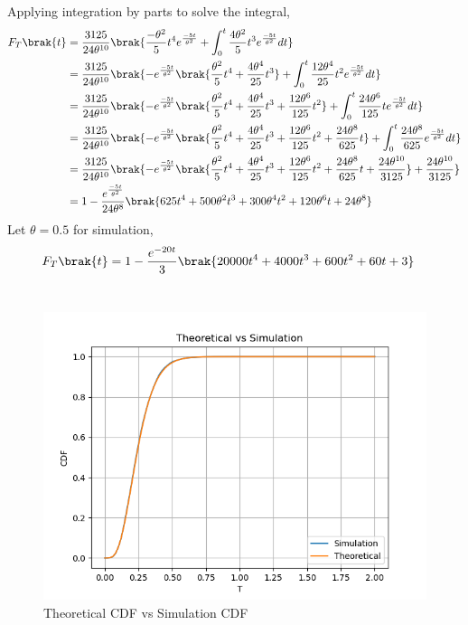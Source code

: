 \documentclass[journal,12pt,onecolumn]{IEEEtran}
\theoremstyle{remark}
\begin{document}
Applying integration by parts to solve the integral,
\begin{align}
	F_T\brak{t} &= \frac{3125}{24\theta^{10}}\brak{\frac{-\theta^2}{5}t^4e^{\frac{-5t}{\theta^2}} + \int^t_0{\frac{4\theta^2}{5}t^3e^{\frac{-5t}{\theta^2}}dt}}\\
	&= \frac{3125}{24\theta^{10}}\brak{-e^{\frac{-5t}{\theta^2}}\brak{\frac{\theta^2}{5}t^4 + \frac{4\theta^4}{25}t^3} + \int^t_0{\frac{12\theta^4}{25}t^2e^{\frac{-5t}{\theta^2}}dt}}\\
	&= \frac{3125}{24\theta^{10}}\brak{-e^{\frac{-5t}{\theta^2}}\brak{\frac{\theta^2}{5}t^4 + \frac{4\theta^4}{25}t^3 + \frac{12\theta^6}{125}t^2}+\int^t_0{\frac{24\theta^6}{125}te^{\frac{-5t}{\theta^2}}dt}}\\
	&= \frac{3125}{24\theta^{10}}\brak{-e^{\frac{-5t}{\theta^2}}\brak{\frac{\theta^2}{5}t^4 + \frac{4\theta^4}{25}t^3 + \frac{12\theta^6}{125}t^2 + \frac{24\theta^8}{625}t} + \int^t_0{\frac{24\theta^8}{625}e^{\frac{-5t}{\theta^2}}dt}}\\
	&= \frac{3125}{24\theta^{10}}\brak{-e^{\frac{-5t}{\theta^2}}\brak{\frac{\theta^2}{5}t^4 + \frac{4\theta^4}{25}t^3 + \frac{12\theta^6}{125}t^2 + \frac{24\theta^8}{625}t + \frac{24\theta^{10}}{3125}} + \frac{24\theta^{10}}{3125}}\\
	&= 1 - \frac{e^{\frac{-5t}{\theta^2}}}{24\theta^8}\brak{625t^4 + 500\theta^2t^3 + 300\theta^4t^2 + 120\theta^6t + 24\theta^8}
\end{align}
Let $\theta = 0.5$ for simulation,
\begin{align}
	F_T\brak{t} &= 1 - \frac{e^{-20t}}{3}\brak{20000t^4 + 4000t^3 + 600t^2 + 60t + 3}
\end{align}
\\
\begin{figure}[!ht]
	\centering
	\includegraphics[width = \columnwidth]{2023/ST/40/figs/cdf.png}
	\caption{Theoretical CDF vs Simulation CDF}
\end{figure}
\end{document}
